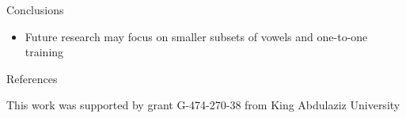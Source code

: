 \documentclass[final,xcolor={cmyk,hyperref}]{beamer}
\begin{document}
\begin{frame}[t]
\begin{columns}[t]
\begin{column}{0.525\linewidth}
\begin{block}{Conclusions}
\begin{itemize}
  \item
    Future research may focus on smaller subsets of vowels and  one-to-one training
\end{itemize}
\end{block}

\vspace*{-0.125in}

\begin{block}{\small References}
  \renewcommand\bibfont{\tiny}
  \printbibliography
\end{block}



  This work was supported by
  grant G-474-270-38 from King Abdulaziz University

\end{column}

\end{columns}

\end{frame}
\end{document}
